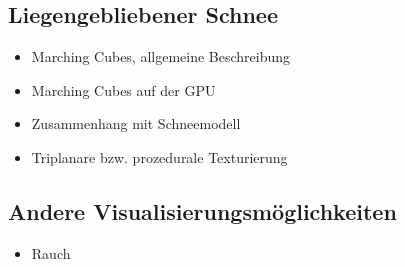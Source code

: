 \subsection{Liegengebliebener Schnee}

\begin{itemize}
\item Marching Cubes, allgemeine Beschreibung
\item Marching Cubes auf der GPU
\item Zusammenhang mit Schneemodell
\item Triplanare bzw. prozedurale Texturierung
\end{itemize}

\subsection{Andere Visualisierungsmöglichkeiten}

\begin{itemize}
\item Rauch
\end{itemize}

